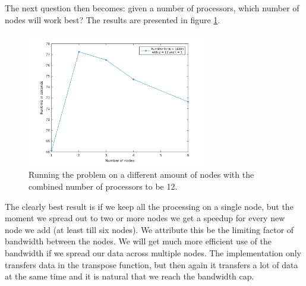The next question then becomes: given a number of processors, which number of nodes will work best? The results are presented in figure \ref{fig:bestnodes}.
\begin{figure}[h]
\centering
\includegraphics[width=0.7\textwidth]{./figures/bestnodes}
\caption{Running the problem on a different amount of nodes with the combined number of processors to be 12.}
\label{fig:bestnodes}
\end{figure}
The clearly best result is if we keep all the processing on a single node, but the moment we spread out to two or more nodes we get a speedup for every new node we add (at least till six nodes). We attribute this be the limiting factor of bandwidth between the nodes. We will get much more efficient use of the bandwidth if we spread our data across multiple nodes. The implementation only transfers data in the transpose function, but then again it transfers a lot of data at the same time and it is natural that we reach the bandwidth cap.


